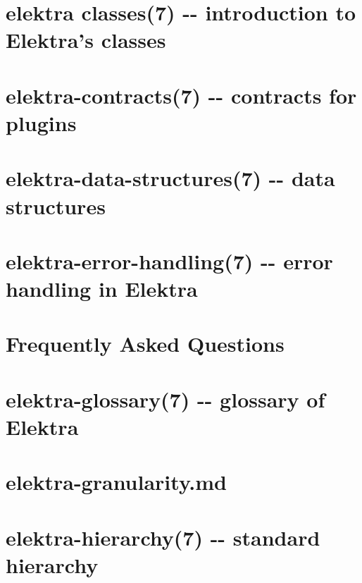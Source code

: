 \documentclass[twoside]{book}
\newcommand{\+}{\discretionary{\mbox{\scriptsize$\hookleftarrow$}}{}{}}
\begin{document}
\chapter{elektra classes(7) -\/-\/ introduction to Elektra's classes}
\label{md_doc_help_elektra-classes}
\hypertarget{md_doc_help_elektra-classes}{}

\chapter{elektra-\/contracts(7) -\/-\/ contracts for plugins}
\label{md_doc_help_elektra-contracts}
\hypertarget{md_doc_help_elektra-contracts}{}

\chapter{elektra-\/data-\/structures(7) -\/-\/ data structures}
\label{md_doc_help_elektra-data-structures}
\hypertarget{md_doc_help_elektra-data-structures}{}

\chapter{elektra-\/error-\/handling(7) -\/-\/ error handling in Elektra}
\label{md_doc_help_elektra-error-handling}
\hypertarget{md_doc_help_elektra-error-handling}{}

\chapter{Frequently Asked Questions}
\label{doc_help_elektra-faq_md}
\hypertarget{doc_help_elektra-faq_md}{}

\chapter{elektra-\/glossary(7) -\/-\/ glossary of Elektra}
\label{md_doc_help_elektra-glossary}
\hypertarget{md_doc_help_elektra-glossary}{}

\chapter{elektra-\/granularity.md}
\label{doc_help_elektra-granularity_md}
\hypertarget{doc_help_elektra-granularity_md}{}

\chapter{elektra-\/hierarchy(7) -\/-\/ standard hierarchy}
\label{md_doc_help_elektra-hierarchy}
\hypertarget{md_doc_help_elektra-hierarchy}{}

\end{document}
